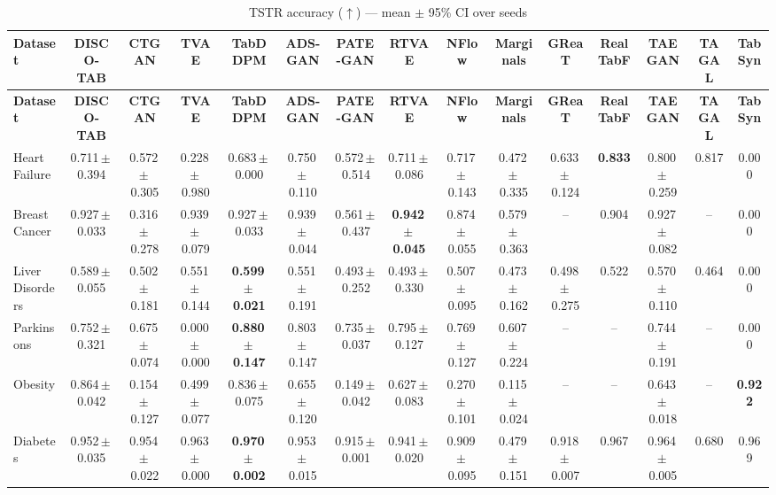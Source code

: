 \documentclass[8pt]{extarticle}
\begin{document}
\begin{longtable}{l*{14}{c}}
\caption{TSTR accuracy ($\uparrow$) --- mean $\pm$ 95\% CI over seeds}\\
\toprule
\textbf{Dataset} & \textbf{DISCO-TAB} & \textbf{CTGAN} & \textbf{TVAE} & \textbf{TabDDPM} & \textbf{ADS-GAN} & \textbf{PATE-GAN} & \textbf{RTVAE} & \textbf{NFlow} & \textbf{Marginals} & \textbf{GReaT} & \textbf{RealTabF} & \textbf{TAEGAN} & \textbf{TAGAL} & \textbf{TabSyn} \\
\midrule
\endfirsthead
\toprule
\textbf{Dataset} & \textbf{DISCO-TAB} & \textbf{CTGAN} & \textbf{TVAE} & \textbf{TabDDPM} & \textbf{ADS-GAN} & \textbf{PATE-GAN} & \textbf{RTVAE} & \textbf{NFlow} & \textbf{Marginals} & \textbf{GReaT} & \textbf{RealTabF} & \textbf{TAEGAN} & \textbf{TAGAL} & \textbf{TabSyn} \\
\midrule
\endhead
\bottomrule
\endfoot
Heart Failure & 0.711\,$\pm$\,0.394 & 0.572\,$\pm$\,0.305 & 0.228\,$\pm$\,0.980 & 0.683\,$\pm$\,0.000 & 0.750\,$\pm$\,0.110 & 0.572\,$\pm$\,0.514 & 0.711\,$\pm$\,0.086 & 0.717\,$\pm$\,0.143 & 0.472\,$\pm$\,0.335 & 0.633\,$\pm$\,0.124 & \textbf{0.833} & 0.800\,$\pm$\,0.259 & 0.817 & 0.000 \\
Breast Cancer & 0.927\,$\pm$\,0.033 & 0.316\,$\pm$\,0.278 & 0.939\,$\pm$\,0.079 & 0.927\,$\pm$\,0.033 & 0.939\,$\pm$\,0.044 & 0.561\,$\pm$\,0.437 & \textbf{0.942\,$\pm$\,0.045} & 0.874\,$\pm$\,0.055 & 0.579\,$\pm$\,0.363 & -- & 0.904 & 0.927\,$\pm$\,0.082 & -- & 0.000 \\
Liver Disorders & 0.589\,$\pm$\,0.055 & 0.502\,$\pm$\,0.181 & 0.551\,$\pm$\,0.144 & \textbf{0.599\,$\pm$\,0.021} & 0.551\,$\pm$\,0.191 & 0.493\,$\pm$\,0.252 & 0.493\,$\pm$\,0.330 & 0.507\,$\pm$\,0.095 & 0.473\,$\pm$\,0.162 & 0.498\,$\pm$\,0.275 & 0.522 & 0.570\,$\pm$\,0.110 & 0.464 & 0.000 \\
Parkinsons & 0.752\,$\pm$\,0.321 & 0.675\,$\pm$\,0.074 & 0.000\,$\pm$\,0.000 & \textbf{0.880\,$\pm$\,0.147} & 0.803\,$\pm$\,0.147 & 0.735\,$\pm$\,0.037 & 0.795\,$\pm$\,0.127 & 0.769\,$\pm$\,0.127 & 0.607\,$\pm$\,0.224 & -- & -- & 0.744\,$\pm$\,0.191 & -- & 0.000 \\
Obesity & 0.864\,$\pm$\,0.042 & 0.154\,$\pm$\,0.127 & 0.499\,$\pm$\,0.077 & 0.836\,$\pm$\,0.075 & 0.655\,$\pm$\,0.120 & 0.149\,$\pm$\,0.042 & 0.627\,$\pm$\,0.083 & 0.270\,$\pm$\,0.101 & 0.115\,$\pm$\,0.024 & -- & -- & 0.643\,$\pm$\,0.018 & -- & \textbf{0.922} \\
Diabetes & 0.952\,$\pm$\,0.035 & 0.954\,$\pm$\,0.022 & 0.963\,$\pm$\,0.000 & \textbf{0.970\,$\pm$\,0.002} & 0.953\,$\pm$\,0.015 & 0.915\,$\pm$\,0.001 & 0.941\,$\pm$\,0.020 & 0.909\,$\pm$\,0.095 & 0.479\,$\pm$\,0.151 & 0.918\,$\pm$\,0.007 & 0.967 & 0.964\,$\pm$\,0.005 & 0.680 & 0.969 \\

\end{longtable}
\end{document}
